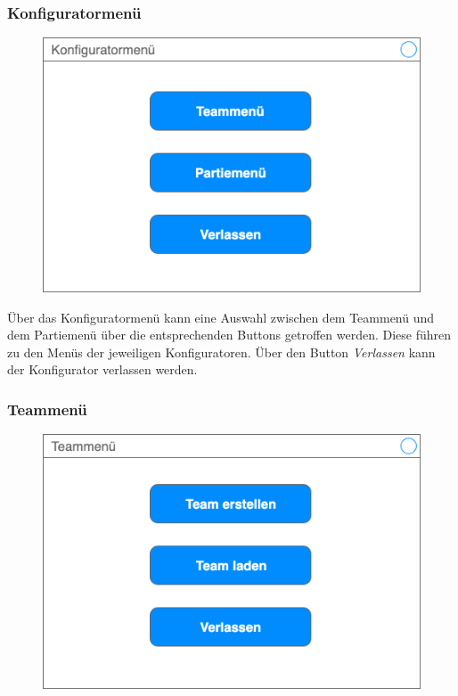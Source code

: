 \subsubsection{Konfiguratormenü}

    \begin{figure}[H]
        \centering
        \includegraphics[width=\textwidth/2]{images/konfiguratormenue}
    \end{figure}

    Über das Konfiguratormenü kann eine Auswahl zwischen dem Teammenü und dem Partiemenü über die entsprechenden Buttons getroffen werden. Diese führen zu den Menüs der jeweiligen Konfiguratoren. Über den Button \textit{Verlassen} kann der Konfigurator verlassen werden.

    \subsubsection{Teammenü}
    \begin{figure}[H]
        \centering
        \includegraphics[width=\textwidth/2]{images/teammenue}
    \end{figure}

